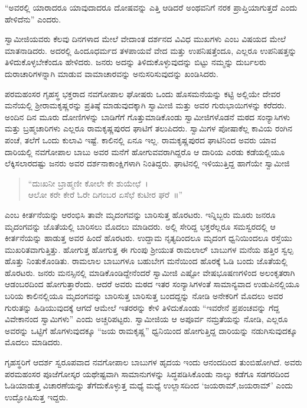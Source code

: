 \vskip 3pt

 “ಅವರಲ್ಲಿ ಯಾರಾದರೂ ಯಾವುದಾದರೂ ದೋಷವನ್ನು ಎತ್ತಿ ಆಡಿದರೆ ಅಂಥವನಿಗೆ ನರಕ ಪ್ರಾಪ್ತಿಯಾಗುತ್ತದೆ ಎಂದು ಹೇಳಿದೆನು” ಎಂದರು. 

\vskip 3pt

 ಸ್ವಾಮೀಜಿಯವರು ಕೆಲವು ದಿನಗಳಾದ ಮೇಲೆ ವೇದಾಂತ ದರ್ಶನದ ವಿವಿಧ ಮುಖಗಳು ಎಂಬ ವಿಷಯದ ಮೇಲೆ ಮಾತನಾಡಿದರು. ಅದರಲ್ಲಿ ಹಿಂದೂಧರ್ಮದ ತಳಪಾಯವೆ ವೇದ ಮತ್ತು ಉಪನಿಷತ್ತೆಂದೂ, ಎಲ್ಲರೂ ಉಪನಿಷತ್ತನ್ನು ತಿಳಿದುಕೊಳ್ಳಬೇಕೆಂದೂ ಹೇಳಿದರು. ಜನರು ಅದನ್ನು ತಿಳಿದುಕೊಳ್ಳುವುದನ್ನು ಬಿಟ್ಟು ನಮ್ಮನ್ನು ದುರ್ಬಲರು ದುರಾಚಾರಿಗಳನ್ನಾಗಿ ಮಾಡುವ ವಾಮಾಚಾರವನ್ನು ಅನುಸರಿಸುವುದನ್ನು ಖಂಡಿಸಿದರು. 

\vskip 3pt

 ಪರಮಹಂಸರ ಗೃಹಸ್ಥ ಭಕ್ತರಾದ ನವಗೋಪಾಲ ಘೋಷರು ಒಂದು ಹೊಸಮನೆಯನ್ನು ಕಟ್ಟಿ ಅಲ್ಲಿಯೇ ದೇವರ ಮನೆಯಲ್ಲಿ ಶ‍್ರೀರಾಮಕೃಷ್ಣರನ್ನು ಪ್ರತಿಷ್ಠೆ ಮಾಡುವುದಕ್ಕಾಗಿ ಸ್ವಾಮೀಜಿ ಮತ್ತು ಅವರ ಗುರುಭಾಯಿಗಳನ್ನು ಕರೆದರು. ಅಂದಿನ ದಿನ ಮೂರು ದೋಣಿಗಳನ್ನು ಬಾಡಿಗೆಗೆ ಗೊತ್ತುಮಾಡಿಕೊಂಡು ಸ್ವಾಮೀಜಿಗಳೊಡನೆ ಮಠದ ಸಂನ್ಯಾಸಿಗಳು ಮತ್ತು ಬ್ರಹ್ಮಚಾರಿಗಳು ಎಲ್ಲರೂ ರಾಮಕೃಷ್ಣಪುರದ ಘಾಟಿಗೆ ತಲುಪಿದರು. ಸ್ವಾಮಿಗಳ ಪೋಷಾಕೆಲ್ಲ ಕಾವಿಯ ರಂಗಿನ ಪಂಚೆ, ತಲೆಗೆ ಒಂದು ಕುಲಾವಿ ಇಷ್ಟೆ. ಕಾಲಿನಲ್ಲಿ ಏನೂ ಇಲ್ಲ. ರಾಮಕೃಷ್ಣಪುರದ ಘಾಟಿನಿಂದ ಅವರು ಯಾವ ದಾರಿಯಲ್ಲಿ ನವಗೋಪಾಲ ಬಾಬು ಅವರ ಮನೆಗೆ ಹೋಗುವವರಾಗಿದ್ದರೊ ಆ ದಾರಿಯ ಎರಡು ಕಡೆಯಲ್ಲಿಯೂ ಲೆಕ್ಕಿಸಲಾರದಷ್ಟು ಜನರು ಅವರ ದರ್ಶನಾಕಾಂಕ್ಷಿಗಳಾಗಿ ನಿಂತಿದ್ದರು. ಘಾಟಿನಲ್ಲಿ ಇಳಿಯುತ್ತಿದ್ದ ಹಾಗೆಯೇ ಸ್ವಾಮೀಜಿ

\begin{verse}
“ದುಃಖನೀ ಬ್ರಾಹ್ಮಣೀ ಕೋಲೇ ಕೇ ಶುಯೇಛೆ~।\\ಆಲೋ ಕರೇ ಕೇರೆ ಓರೇ ದಿಗಂಬರ ಏಸೆಛೆ ಕುಟೀರ ಘರೆ~॥”
\end{verse}

 ಎಂಬ ಕೀರ್ತನೆಯನ್ನು ಆರಂಭಿಸಿ ತಾವೇ ಮೃದಂಗವನ್ನು ಬಾರಿಸುತ್ತ ಹೊರಟರು. ಇನ್ನಿಬ್ಬರು ಮೂರು ಜನರೂ‌ ಮೃದಂಗವನ್ನು ಜೊತೆಯಲ್ಲಿ ಬಾರಿಸಲು ಮೊದಲು ಮಾಡಿದರು. ಅಲ್ಲಿ ಸೇರಿದ್ದ ಭಕ್ತರೆಲ್ಲರೂ‌ ಸಮಸ್ವರದಲ್ಲಿ ಆ ಕೀರ್ತನೆಯನ್ನು ಹಾಡುತ್ತ ಅವರ ಹಿಂದೆ ಹೊರಟರು. ಉದ್ದಾಮ ನೃತ್ಯದಿಂದಲೂ ಮೃದಂಗ ಧ್ವನಿಯಿಂದಲೂ ರಸ್ತೆಯು ಮುಖರಿತವಾಗುತ್ತಿತ್ತು. ಹೋಗುತ್ತ ಹೋಗುತ್ತ ಈ ಗುಂಪು ಶ‍್ರೀಯುತ ರಾಮಲಾಲ್ ಬಾಬುಗಳ ಮನೆಯ ಹತ್ತಿರ ಸ್ವಲ್ಪ ಹೊತ್ತು ನಿಂತುಕೊಂಡಿತು. ರಾಮಲಾಲ ಬಾಬುಗಳೂ ಬಹುಬೇಗ ಮನೆಯಿಂದ ಹೊರಕ್ಕೆ ಓಡಿ ಬಂದು ಜೊತೆಯಲ್ಲಿ ಹೊರಟರು. ಜನರು ಮನಸ್ಸಿನಲ್ಲಿ ಮಾಡಿಕೊಂಡಿದ್ದೇನೆಂದರೆ ಸ್ವಾಮೀಜಿ ಎಷ್ಟೋ ವೇಷಭೂಷಣಗಳಿಂದ ಅಲಂಕೃತರಾಗಿ ಆಡಂಬರದಿಂದ ಹೋಗುತ್ತಾರೆಂದು. ಆದರೆ ಅವರು ಮಠದ ಇತರ ಸಂನ್ಯಾಸಿಗಳಂತೆ ಸಾಮಾನ್ಯವಾದ ಉಡುಪಿನಲ್ಲಿಯೂ ಬರಿಯ ಕಾಲಿನಲ್ಲಿಯೂ ಮೃದಂಗವನ್ನು ಬಾರಿಸುತ್ತ ಬಾರಿಸುತ್ತ ಬಂದದ್ದನ್ನು ನೋಡಿ ಅನೇಕರಿಗೆ ಮೊದಲು ಅವರ ಗುರುತನ್ನು ಹಿಡಿಯುವುದಕ್ಕೆ ಆಗದೆ ಆಮೇಲೆ ಇತರರನ್ನು ಕೇಳಿ ತಿಳಿದುಕೊಂಡು “ಇವರೇನೆ ಪ್ರಪಂಚವನ್ನು ಗೆದ್ದ ವಿವೇಕಾನಂದ ಸ್ವಾಮಿಗಳು” ಎಂದು ಅಚ್ಚರಿಪಟ್ಟರು. ಸ್ವಾಮೀಜಿಯ ಆ ಅಪೂರ್ವ ನಮ್ರತೆಯನ್ನು ನೋಡಿ, ಎಲ್ಲರೂ ಅವರನ್ನು ಒಟ್ಟಿಗೆ ಹೊಗಳುವುದಕ್ಕೂ “ಜಯ ರಾಮಕೃಷ್ಣ” ಧ್ವನಿಯಿಂದ ಹೋಗುತ್ತಿದ್ದ ದಾರಿಯನ್ನು ನಡುಗಿಸುವುದಕ್ಕೂ ಮೊದಲು ಮಾಡಿದರು. 

\vskip 2pt

 ಗೃಹಸ್ಥರಿಗೆ ಆದರ್ಶ ಸ್ವರೂಪವಾದ ನವಗೋಪಾಲ ಬಾಬುಗಳ ಹೃದಯ ಇಂದು ಆನಂದದಿಂದ ತುಂಬಿಹೋಗಿದೆ. ಅವರು ಪರಮಹಂಸರ ಪೂಜೆಗೋಸ್ಕರ ಯಥೇಷ್ಟವಾಗಿ ಸಾಮಾನುಗಳನ್ನು ಸಿದ್ಧಪಡಿಸಿಕೊಂಡು ನಾಲ್ಕು ಕಡೆಗೂ ಸಡಗರದಿಂದ ಓಡಿಯಾಡುತ್ತ ವಿಚಾರಣೆಯನ್ನು ತೆಗೆದುಕೊಳ್ಳುತ್ತ ಮಧ್ಯೆ ಮಧ್ಯೆ ಉಲ್ಲಾಸದಿಂದ ‘ಜಯರಾಮ್,\break ಜಯರಾಮ್’ ಎಂದು ಉದ್ಘೋಷಿಸುತ್ತ ಇದ್ದರು. 

